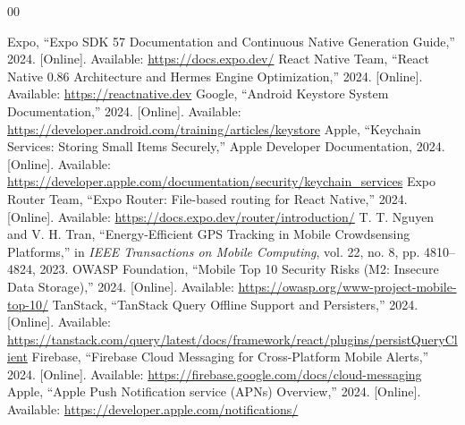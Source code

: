 \documentclass[conference,10pt,a4paper]{IEEEtran}
\begin{document}
\begin{thebibliography}{00}

 Expo, ``Expo SDK 57 Documentation and Continuous Native Generation Guide,'' 2024. [Online]. Available: \url{https://docs.expo.dev/}
 React Native Team, ``React Native 0.86 Architecture and Hermes Engine Optimization,'' 2024. [Online]. Available: \url{https://reactnative.dev}
 Google, ``Android Keystore System Documentation,'' 2024. [Online]. Available: \url{https://developer.android.com/training/articles/keystore}
 Apple, ``Keychain Services: Storing Small Items Securely,'' Apple Developer Documentation, 2024. [Online]. Available: \url{https://developer.apple.com/documentation/security/keychain_services}
 Expo Router Team, ``Expo Router: File-based routing for React Native,'' 2024. [Online]. Available: \url{https://docs.expo.dev/router/introduction/}
 T. T. Nguyen and V. H. Tran, ``Energy-Efficient GPS Tracking in Mobile Crowdsensing Platforms,'' in \textit{IEEE Transactions on Mobile Computing}, vol. 22, no. 8, pp. 4810--4824, 2023.
 OWASP Foundation, ``Mobile Top 10 Security Risks (M2: Insecure Data Storage),'' 2024. [Online]. Available: \url{https://owasp.org/www-project-mobile-top-10/}
 TanStack, ``TanStack Query Offline Support and Persisters,'' 2024. [Online]. Available: \url{https://tanstack.com/query/latest/docs/framework/react/plugins/persistQueryClient}
 Firebase, ``Firebase Cloud Messaging for Cross-Platform Mobile Alerts,'' 2024. [Online]. Available: \url{https://firebase.google.com/docs/cloud-messaging}
 Apple, ``Apple Push Notification service (APNs) Overview,'' 2024. [Online]. Available: \url{https://developer.apple.com/notifications/}

\end{thebibliography}
\end{document}
